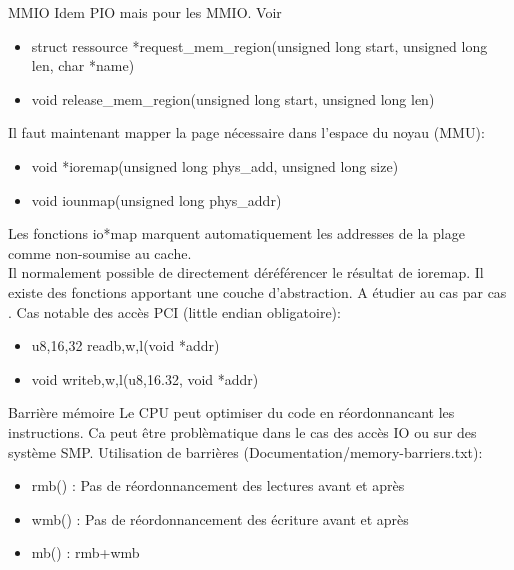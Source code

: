   \begin{frame}{MMIO}
Idem PIO mais pour les MMIO.
Voir 
    \begin{itemize} 
\item struct ressource *request_mem_region(unsigned long start, unsigned long len, char *name)
\item void release_mem_region(unsigned long start, unsigned long len)
    \end{itemize}
Il faut maintenant mapper la page nécessaire dans l'espace du noyau (MMU):
\begin{itemize} 
\item void *ioremap(unsigned long phys_add, unsigned long size)
\item void iounmap(unsigned long phys_addr)
\end{itemize} 
Les fonctions io*map marquent automatiquement les addresses de la plage comme non-soumise au cache.\\
Il normalement possible de directement déréférencer le résultat de ioremap. Il existe des fonctions apportant une couche d'abstraction. A étudier au cas par cas . Cas notable des accès PCI (little endian obligatoire):
\begin{itemize} 
\item u{8,16,32} read{b,w,l}(void *addr)
\item void write{b,w,l}(u{8,16.32}, void *addr)
\end{itemize} 

  \end{frame} 

\begin{frame}{Barrière mémoire}
  Le CPU peut optimiser du code en réordonnancant les instructions. Ca
  peut être problèmatique dans le cas  des accès IO ou sur des système
  SMP. Utilisation de barrières (Documentation/memory-barriers.txt):
\begin{itemize}
\item rmb() : Pas de réordonnancement des lectures avant et après
\item wmb() : Pas de réordonnancement des écriture avant et après
\item mb() : rmb+wmb
\end{itemize} 
\end{frame} 

